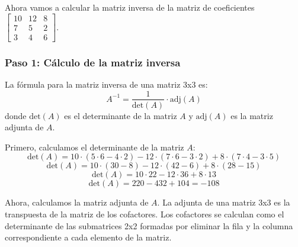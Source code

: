 \documentclass[]{article}
\begin{document}
	Ahora vamos a calcular la matriz inversa de la matriz de coeficientes \(\begin{bmatrix} 10 & 12 & 8 \\ 7 & 5 & 2 \\ 3 & 4 & 6 \end{bmatrix}\).
	
	\subsubsection*{Paso 1: Cálculo de la matriz inversa}
	La fórmula para la matriz inversa de una matriz 3x3 es:
	\[
	A^{-1} = \frac{1}{\text{det}(A)} \cdot \text{adj}(A)
	\]
	donde \(\text{det}(A)\) es el determinante de la matriz \(A\) y \(\text{adj}(A)\) es la matriz adjunta de \(A\).
	
	Primero, calculamos el determinante de la matriz \(A\):
	\[
	\text{det}(A) = 10 \cdot (5 \cdot 6 - 4 \cdot 2) - 12 \cdot (7 \cdot 6 - 3 \cdot 2) + 8 \cdot (7 \cdot 4 - 3 \cdot 5)
	\]
	\[
	\text{det}(A) = 10 \cdot (30 - 8) - 12 \cdot (42 - 6) + 8 \cdot (28 - 15)
	\]
	\[
	\text{det}(A) = 10 \cdot 22 - 12 \cdot 36 + 8 \cdot 13
	\]
	\[
	\text{det}(A) = 220 - 432 + 104 = -108
	\]
	
	Ahora, calculamos la matriz adjunta de \(A\). La adjunta de una matriz 3x3 es la transpuesta de la matriz de los cofactores. Los cofactores se calculan como el determinante de las submatrices 2x2 formadas por eliminar la fila y la columna correspondiente a cada elemento de la matriz.
\end{document}
